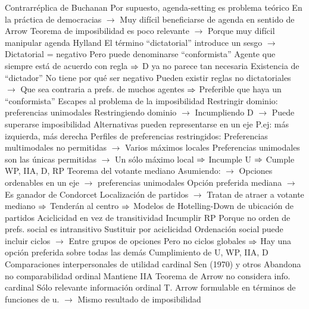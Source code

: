 \documentclass{nuevotema}
\begin{document}
\begin{esquemal}
				\4 Contrarréplica de Buchanan
				\4[] Por supuesto, agenda-setting es problema teórico
				\4[] En la práctica de democracias
				\4[] $\to$ Muy difícil beneficiarse de agenda en sentido de Arrow
				\4[] Teorema de imposibilidad es poco relevante
				\4[] $\to$ Porque muy difícil manipular agenda
			\3 Hylland
				\4 El término ``dictatorial'' introduce un sesgo
				\4[] $\to$ Dictatorial = negativo
				\4 Pero puede denominarse ``conformista''
				\4[] Agente que siempre está de acuerdo con regla
				\4[] $\then$ D ya no parece tan necesaria
				\4 Existencia de ``dictador''
				\4[] No tiene por qué ser negativo
				\4[] Pueden existir reglas no dictatoriales
				\4[] $\to$ Que sea contraria a prefs. de muchos agentes
				\4[] $\then$ Preferible que haya un ``conformista''
		\2 Escapes al problema de la imposibilidad
			\3 Restringir dominio: preferencias unimodales
				\4 Restringiendo dominio
				\4[] $\to$ Incumpliendo D
				\4[] $\to$ Puede superarse imposibilidad
				\4 Alternativas pueden representarse en un eje
				\4[] P.ej: más izquierda, más derecha
				\4 Perfiles de preferencias restringidos:
				\4[] Preferencias multimodales no permitidas
				\4[] $\to$ Varios máximos locales
				\4[] 
				\4[] Preferencias unimodales son las únicas permitidas
				\4[] $\to$ Un sólo máximo local
				\4[] 
				\4[] $\then$ Incumple U
				\4[] $\then$ Cumple WP, IIA, D, RP
				\4 Teorema del votante mediano
				\4[] Asumiendo:
				\4[] $\to$ Opciones ordenables en un eje
				\4[] $\to$ preferencias unimodales
				\4[] Opción preferida mediana
				\4[] $\to$ Es ganador de Condorcet
				\4[] Localización de partidos
				\4[] $\to$ Tratan de atraer a votante mediano
				\4[] $\then$ Tenderán al centro
				\4[] $\then$ Modelos de Hotelling-Down de ubicación de partidos
			\3 Aciclicidad en vez de transitividad
				\4 Incumplir RP
				\4[] Porque no orden de prefs. social es intransitivo
				\4 Sustituir por aciclicidad
				\4[] Ordenación social puede incluir ciclos
				\4[] $\to$ Entre grupos de opciones
				\4[] Pero no ciclos globales
				\4[] $\then$ Hay una opción preferida sobre todas las demás
				\4[$\then$] Cumplimiento de U, WP, IIA, D
			\3 Comparaciones interpersonales de utilidad cardinal
				\4 Sen (1970) y otros
				\4[] Abandona no comparabilidad ordinal
				\4[] Mantiene IIA
				\4 Teorema de Arrow no considera info. cardinal
				\4[] Sólo relevante información ordinal
				\4[] T. Arrow formulable en términos de funciones de u.
				\4[] $\to$ Mismo resultado de imposibilidad

\end{esquemal}
\end{document}
